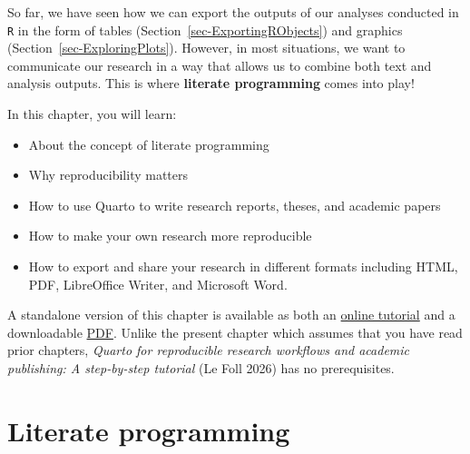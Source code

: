 \documentclass[
  letterpaper,
  DIV=11,
  numbers=noendperiod]{scrreprt}
\providecommand{\tightlist}{%
  \setlength{\itemsep}{0pt}\setlength{\parskip}{0pt}}
\begin{document}
So far, we have seen how we can export the outputs of our analyses
conducted in \texttt{R} in the form of tables
(Section~\ref{sec-ExportingRObjects}) and graphics
(Section~\ref{sec-ExploringPlots}). However, in most situations, we want
to communicate our research in a way that allows us to combine both text
and analysis outputs. This is where \textbf{literate programming} comes
into play!

In this chapter, you will learn:

\begin{itemize}
\tightlist
\item
  About the concept of literate programming
\item
  Why reproducibility matters
\item
  How to use Quarto to write research reports, theses, and academic
  papers
\item
  How to make your own research more reproducible
\item
  How to export and share your research in different formats including
  HTML, PDF, LibreOffice Writer, and Microsoft Word.
\end{itemize}

\begin{tcolorbox}[enhanced jigsaw, arc=.35mm, bottomrule=.15mm, bottomtitle=1mm, breakable, colback=white, colbacktitle=quarto-callout-note-color!10!white, colframe=quarto-callout-note-color-frame, coltitle=black, left=2mm, leftrule=.75mm, opacityback=0, opacitybacktitle=0.6, rightrule=.15mm, title=\textcolor{quarto-callout-note-color}{\faInfo}\hspace{0.5em}{Note}, titlerule=0mm, toprule=.15mm, toptitle=1mm]

A standalone version of this chapter is available as both an
\href{https://elenlefoll.quarto.pub/quarto4research/}{online tutorial}
and a downloadable
\href{https://elenlefoll.quarto.pub/quarto4research/Quarto4Research.pdf}{PDF}.
Unlike the present chapter which assumes that you have read prior
chapters, \emph{Quarto for reproducible research workflows and academic
publishing: A step-by-step tutorial} (Le Foll 2026) has no
prerequisites.

\end{tcolorbox}

\section{Literate programming}\label{sec-LitProgramming}
\end{document}
